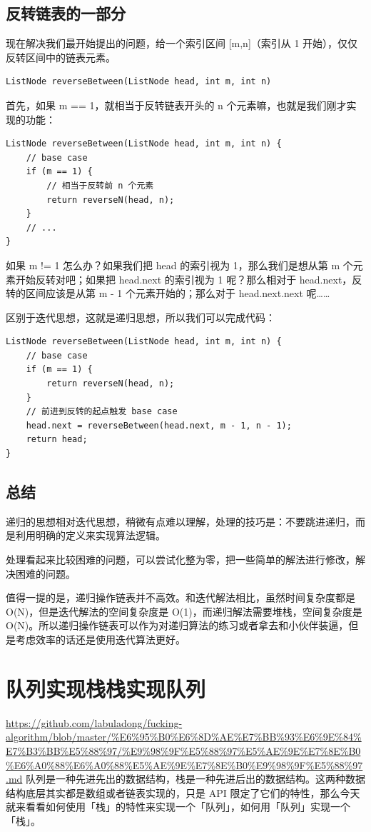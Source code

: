 \documentclass[12pt]{article}
\begin{document}
\subsection{反转链表的一部分}
现在解决我们最开始提出的问题，给一个索引区间 [m,n]（索引从 1 开始），仅仅反转区间中的链表元素。
\begin{lstlisting}
ListNode reverseBetween(ListNode head, int m, int n)
\end{lstlisting}

首先，如果 m == 1，就相当于反转链表开头的 n 个元素嘛，也就是我们刚才实现的功能：
\begin{lstlisting}
ListNode reverseBetween(ListNode head, int m, int n) {
    // base case
    if (m == 1) {
        // 相当于反转前 n 个元素
        return reverseN(head, n);
    }
    // ...
}
\end{lstlisting}

如果 m != 1 怎么办？如果我们把 head 的索引视为 1，那么我们是想从第 m 个元素开始反转对吧；如果把 head.next 的索引视为 1 呢？那么相对于 head.next，反转的区间应该是从第 m - 1 个元素开始的；那么对于 head.next.next 呢……

区别于迭代思想，这就是递归思想，所以我们可以完成代码：
\begin{lstlisting}
ListNode reverseBetween(ListNode head, int m, int n) {
    // base case
    if (m == 1) {
        return reverseN(head, n);
    }
    // 前进到反转的起点触发 base case
    head.next = reverseBetween(head.next, m - 1, n - 1);
    return head;
}
\end{lstlisting}

\subsection{总结}
递归的思想相对迭代思想，稍微有点难以理解，处理的技巧是：不要跳进递归，而是利用明确的定义来实现算法逻辑。

处理看起来比较困难的问题，可以尝试化整为零，把一些简单的解法进行修改，解决困难的问题。

值得一提的是，递归操作链表并不高效。和迭代解法相比，虽然时间复杂度都是 O(N)，但是迭代解法的空间复杂度是 O(1)，而递归解法需要堆栈，空间复杂度是 O(N)。所以递归操作链表可以作为对递归算法的练习或者拿去和小伙伴装逼，但是考虑效率的话还是使用迭代算法更好。

\section{队列实现栈栈实现队列}
\url{https://github.com/labuladong/fucking-algorithm/blob/master/%E6%95%B0%E6%8D%AE%E7%BB%93%E6%9E%84%E7%B3%BB%E5%88%97/%E9%98%9F%E5%88%97%E5%AE%9E%E7%8E%B0%E6%A0%88%E6%A0%88%E5%AE%9E%E7%8E%B0%E9%98%9F%E5%88%97.md}
队列是一种先进先出的数据结构，栈是一种先进后出的数据结构。这两种数据结构底层其实都是数组或者链表实现的，只是 API 限定了它们的特性，那么今天就来看看如何使用「栈」的特性来实现一个「队列」，如何用「队列」实现一个「栈」。
\end{document}
